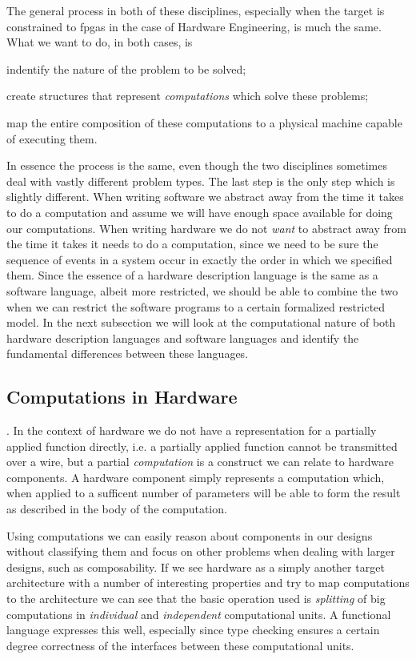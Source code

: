 The general process in both of these disciplines, especially when the target is constrained to \glspl{fpga} in the case of Hardware Engineering, is much the same. 
What we want to do, in both cases, is  
\begin{inparaenum}
\item indentify the nature of the problem to be solved;
\item create structures that represent \textit{computations} which solve these problems;
\item map the entire composition of these computations to a physical machine capable of executing them.
\end{inparaenum}

In essence the process is the same, even though the two disciplines sometimes deal with vastly different problem types.
The last step is the only step which is slightly different.
When writing software we abstract away from the time it takes to do a computation and assume we will have enough space available for doing our computations.
When writing hardware we do not \textit{want} to abstract away from the time it takes it needs to do a computation, since we need to be sure the sequence of events in a system occur in exactly the order in which we specified them.
Since the essence of a hardware description language is the same as a software language, albeit more restricted, we should be able to combine the two when we can restrict the software programs to a certain formalized restricted model.
In the next subsection we will look at the computational nature of both hardware description languages and software languages and identify the fundamental differences between these languages.

\subsection{Computations in Hardware}
.
In the context of hardware we do not have a representation for a partially applied function directly, i.e. a partially applied function cannot be transmitted over a wire, but a partial \textit{computation} is a construct we can relate to hardware components.
A hardware component simply represents a computation which, when applied to a sufficent number of parameters will be able to form the result as described in the body of the computation.

Using computations we can easily reason about components in our designs without classifying them and focus on other problems when dealing with larger designs, such as composability.
If we see hardware as a simply another target architecture with a number of interesting properties and try to map computations to the architecture we can see that the basic operation used is \textit{splitting} of big computations in \textit{individual} and \textit{independent} computational units.
A functional language expresses this well, especially since type checking ensures a certain degree correctness of the interfaces between these computational units.

